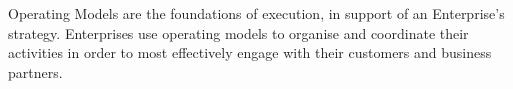 %
%
Operating Models are the foundations of execution, in support of an Enterprise's strategy.
Enterprises use operating models to organise and coordinate their activities in order to most effectively engage
with their customers and business partners.
